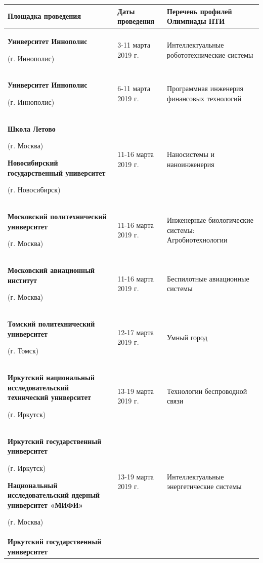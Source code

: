 \begin{center}
    \small
    \begin{longtable}{|p{7.5cm}|p{2.5cm}|p{5cm}|}
        \hline
        \textbf{Площадка проведения} & \textbf{Даты проведения} & \textbf{Перечень профилей Олимпиады НТИ} \\
        \hline
        \textbf{Университет Иннополис}
        
        (г. Иннополис) & 3-11 марта 2019 г. & Интеллектуальные робототехнические системы\\
        \hline
        \textbf{Университет Иннополис}
        
        (г. Иннополис) & 6-11 марта 2019 г. & Программная инженерия финансовых технологий\\
        \hline
        \textbf{Школа Летово}

        (г. Москва)

        \textbf{Новосибирский государственный университет}

        (г. Новосибирск) & 11-16 марта 2019 г. & Наносистемы и наноинженерия \\
        \hline
        \textbf{Московский политехнический университет} 

        (г. Москва) & 11-16 марта 2019 г. & Инженерные биологические системы: Агробиотехнологии \\
        \hline
        \textbf{Московский авиационный институт}

        (г. Москва) & 11-16 марта 2019 г. & Беспилотные авиационные системы \\
        \hline
        \textbf{Томский политехнический университет} 

        (г. Томск) & 12-17 марта 2019 г. & Умный город \\
        \hline
        \textbf{Иркутский национальный исследовательский технический университет}

        (г. Иркутск) & 13-19 марта 2019 г. & Технологии беспроводной связи\\
        \hline
        \textbf{Иркутский государственный университет} 

        (г. Иркутск)

        \textbf{Национальный исследовательский ядерный университет «МИФИ»}
        
        (г. Москва) & 13-19 марта 2019 г. & Интеллектуальные энергетические системы \\
        \hline
        \textbf{Иркутский государственный университет} 


\end{longtable}
\end{center}
